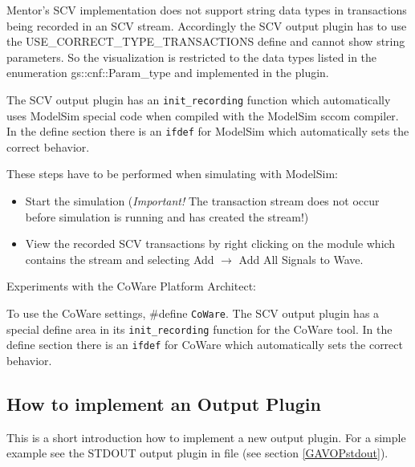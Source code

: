 Mentor's SCV implementation does not support string data types in transactions being recorded in an SCV stream. Accordingly the SCV output plugin has to use the {\sffamily \small USE\_CORRECT\_TYPE\_TRANSACTIONS} define and cannot show string parameters. So the visualization is restricted to the data types listed in the enumeration {\sffamily gs::cnf::Param\_type} and implemented in the plugin.

The SCV output plugin has an \lstinline|init_recording| function which automatically uses ModelSim special code when compiled with the ModelSim sccom compiler. In the define section there is an \lstinline|ifdef| for ModelSim which automatically sets the correct behavior.
  
These steps have to be performed when simulating with ModelSim:
\begin{itemize}
  \item Start the simulation ({\em Important!} The transaction stream does not occur before simulation is running and has created the stream!)
  \item View the recorded SCV transactions by right clicking on the module which contains the stream and selecting {\sffamily Add $\rightarrow$ Add All Signals to Wave}. %
\end{itemize}


Experiments with the {\sffamily CoWare Platform Architect}:

To use the CoWare settings, \#define \lstinline|CoWare|. The SCV output plugin has a special define area in its \lstinline|init_recording| function for the CoWare tool. In the define section there is an \lstinline|ifdef| for CoWare which automatically sets the correct behavior.


\subsection{How to implement an Output Plugin}
\label{GAVimplementOP}

This is a short introduction how to implement a new output plugin. For a simple example see the STDOUT output plugin in file  (see section \ref{GAVOPstdout}).

